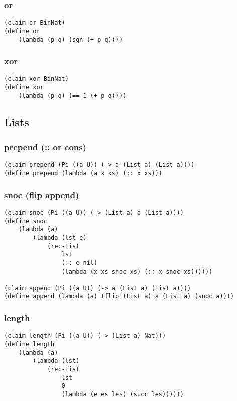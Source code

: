 \subsubsection{or} \label{code:or}
\begin{verbatim}
(claim or BinNat)
(define or
    (lambda (p q) (sgn (+ p q))))
\end{verbatim}

\subsubsection{xor} \label{code:xor}
\begin{verbatim}
(claim xor BinNat)
(define xor
    (lambda (p q) (== 1 (+ p q))))
\end{verbatim}


\subsection{Lists}

\subsubsection{prepend (:: or cons)} \label{code:prepend}
\begin{verbatim}
(claim prepend (Pi ((a U)) (-> a (List a) (List a))))
(define prepend (lambda (a x xs) (:: x xs)))
\end{verbatim}

\subsubsection{snoc (flip append)} \label{code:snoc}
\begin{verbatim}
(claim snoc (Pi ((a U)) (-> (List a) a (List a))))
(define snoc
    (lambda (a)
        (lambda (lst e)
            (rec-List
                lst
                (:: e nil)
                (lambda (x xs snoc-xs) (:: x snoc-xs))))))

(claim append (Pi ((a U)) (-> a (List a) (List a))))
(define append (lambda (a) (flip (List a) a (List a) (snoc a))))
\end{verbatim}


\subsubsection{length} \label{code:length}
\begin{verbatim}
(claim length (Pi ((a U)) (-> (List a) Nat)))
(define length
    (lambda (a)
        (lambda (lst)
            (rec-List
                lst
                0
                (lambda (e es les) (succ les))))))
\end{verbatim}

